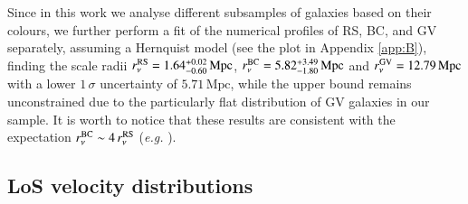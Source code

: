 \documentclass{aa}
\begin{document}
Since in this work we analyse different subsamples of galaxies based on their colours, we further perform a fit of the numerical profiles of RS, BC, and GV separately, assuming a Hernquist model (see the plot in Appendix \ref{app:B}), finding the scale radii $r_\nu^{\rm RS}=1.64^{+0.02}_{-0.60} \, \mathrm{Mpc}$, $r_\nu^{\rm BC}=5.82^{+3.49}_{-1.80} \, \mathrm{Mpc}$ and $r_\nu^{\rm GV}=12.79 \, \mathrm{Mpc}$ with a lower $1\,\sigma$ uncertainty of $5.71 \, \mathrm{Mpc}$, while the upper bound remains unconstrained due to the particularly flat distribution of GV galaxies in our sample.  It is worth to notice that these results are consistent with the expectation $r_\nu^{\rm BC} \sim 4 \, r_\nu^{\rm RS}$ (\textit{e.g.} \citealt{Collister_2005}). %


\subsection{LoS velocity distributions}
\label{subsec:LoS_methods}
\end{document}
